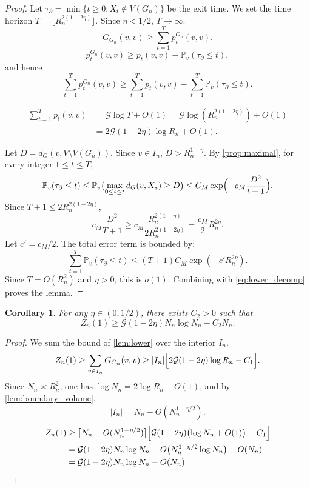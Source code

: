 \documentclass[reqno]{amsart}
\numberwithin{equation}{section}
\newtheorem{corollary}[corollary]{Corollary}
\theoremstyle{definition}
\theoremstyle{remark}
\newcommand{\Cref}[1]{\autoref{#1}}
\newcommand{\cG}{\mathcal{G}}
\newcommand{\Prob}{\mathbb{P}}
\begin{document}
\begin{proof}
Let $\tau_{\partial} = \min\{t \geq 0 : X_t \notin V(G_n)\}$ be the exit time. We set the time horizon $T = \lfloor R_n^{2(1-2\eta)} \rfloor$. Since $\eta < 1/2$, $T \to \infty$.
\[
G_{G_n}(v,v) \geq \sum_{t=1}^{T} p_t^{G_n}(v,v).
\]
\[
  p_t^{G_n}(v,v)\ge p_t(v,v)-\Prob_v(\tau_{\partial}\le t),
\]
and hence
\begin{equation}\label{eq:lower_decomp}
\sum_{t=1}^{T} p_t^{G_n}(v,v) \geq \sum_{t=1}^{T} p_t(v,v) - \sum_{t=1}^{T} \Prob_v(\tau_{\partial} \leq t).
\end{equation}

\begin{align*}
\sum_{t=1}^{T} p_t(v,v) &= \cG \log T + O(1)
  = \cG \log(R_n^{2(1-2\eta)}) + O(1) \\
&= 2\cG (1-2\eta)\log R_n + O(1).
\end{align*}

Let $D = d_G(v, V \setminus V(G_n))$. Since $v \in I_n$, $D > R_n^{1-\eta}$. By \Cref{prop:maximal}, for every integer $1\le t \leq T$,
\[
\Prob_v(\tau_{\partial} \leq t) \leq \Prob_v\bigl( \max_{0 \leq s \leq t} d_G(v,X_s) \geq D \bigr) \leq C_M \exp\Bigl(-c_M \frac{D^2}{t+1}\Bigr).
\]
Since $T+1 \leq 2 R_n^{2(1-2\eta)}$,
\[
c_M \frac{D^2}{T+1} \geq c_M \frac{R_n^{2(1-\eta)}}{2 R_n^{2(1-2\eta)}} = \frac{c_M}{2} R_n^{2\eta}.
\]
Let $c' = c_M/2$. The total error term is bounded by:
\[
\sum_{t=1}^T \Prob_v(\tau_{\partial} \leq t) \leq (T+1) C_M \exp(-c' R_n^{2\eta}).
\]
Since $T = O(R_n^2)$ and $\eta>0$, this is $o(1)$. Combining with \eqref{eq:lower_decomp} proves the lemma.
\end{proof}

\begin{corollary}\label{cor:lower}
For any $\eta \in (0,1/2)$, there exists $C_2 > 0$ such that
\[
Z_n(1) \geq \cG(1-2\eta) N_n \log N_n - C_2 N_n.
\]
\end{corollary}

\begin{proof}
We sum the bound of \Cref{lem:lower} over the interior $I_n$.
\[
Z_n(1) \geq \sum_{v \in I_n} G_{G_n}(v,v) \geq |I_n|\Bigl[2\cG(1-2\eta)\log R_n - C_1\Bigr].
\]
Since $N_n \asymp R_n^2$, one has $\log N_n = 2\log R_n + O(1)$, and by \Cref{lem:boundary_volume},
\[
  |I_n| = N_n - O(N_n^{1-\eta/2}).
\]
\begin{align*}
Z_n(1) &\geq \bigl[N_n - O(N_n^{1-\eta/2})\bigr]
          \Bigl[\cG(1-2\eta)\bigl(\log N_n + O(1)\bigr) - C_1\Bigr] \\
&= \cG(1-2\eta) N_n \log N_n - O\bigl(N_n^{1-\eta/2}\log N_n\bigr) - O(N_n) \\
&= \cG(1-2\eta) N_n \log N_n - O(N_n).\qedhere
\end{align*}
\end{proof}
\end{document}

